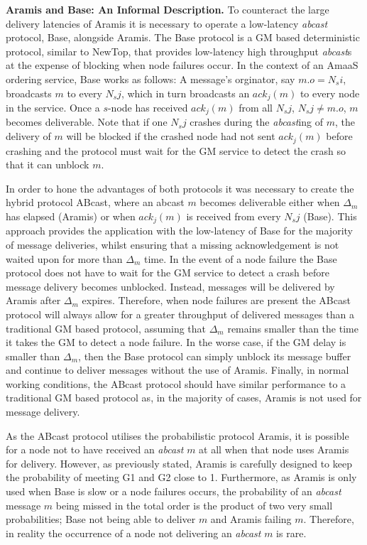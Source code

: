     \textbf{\textsf{Aramis} and \textsf{Base}: An Informal Description.} To counteract the large delivery latencies of \textsf{Aramis} it is necessary to operate a low-latency \emph{abcast} protocol, \textsf{Base}, alongside \textsf{Aramis}.  The \textsf{Base} protocol is a GM based deterministic protocol, similar to NewTop\citep{Ezhilchelvan:1995:NFG:876885.880005}, that provides low-latency high throughput \emph{abcast}s at the expense of blocking when node failures occur.  In the context of an \textsf{AmaaS} ordering service, \textsf{Base} works as follows: A message's orginator, say $m.o = N_si$, broadcasts $m$ to every $N_sj$, which in turn broadcasts an $ack_j(m)$ to every node in the service.  Once a $s$-node has received $ack_j(m)$ from all $N_sj$, $N_sj \neq m.o$, $m$ becomes deliverable.  Note that if one $N_sj$ crashes during the \emph{abcast}ing of $m$, the delivery of $m$ will be blocked if the crashed node had not sent $ack_j(m)$ before crashing and the protocol must wait for the GM service to detect the crash so that it can unblock $m$.   

    
    In order to hone the advantages of both protocols it was necessary to create the hybrid protocol \textsf{ABcast}, where an \textsf{abcast} $m$ becomes deliverable either when $\Delta_m$ has elapsed (\textsf{Aramis}) or when $ack_j(m)$ is received from every $N_sj$ (\textsf{Base}).  This approach provides the application with the low-latency of \textsf{Base} for the majority of message deliveries, whilst ensuring that a missing acknowledgement is not waited upon for more than $\Delta_m$ time.  In the event of a node failure the \textsf{Base} protocol does not have to wait for the GM service to detect a crash before message delivery becomes unblocked.  Instead, messages will be delivered by \textsf{Aramis} after $\Delta_m$ expires.  Therefore, when node failures are present the \textsf{ABcast} protocol will always allow for a greater throughput of delivered messages than a traditional GM based protocol, assuming that $\Delta_m$ remains smaller than the time it takes the GM to detect a node failure.  In the worse case, if the GM delay is smaller than $\Delta_m$, then the \textsf{Base} protocol can simply unblock its message buffer and continue to deliver messages without the use of \textsf{Aramis}.  Finally, in normal working conditions, the \textsf{ABcast} protocol should have similar performance to a traditional GM based protocol as, in the majority of cases, \textsf{Aramis} is not used for message delivery.  

As the \textsf{ABcast} protocol utilises the probabilistic protocol \textsf{Aramis}, it is possible for a node not to have received an \emph{abcast} $m$ at all when that node uses \textsf{Aramis} for delivery.  However, as previously stated, \textsf{Aramis} is carefully designed to keep the probability of meeting G1 and G2 close to 1.  Furthermore, as \textsf{Aramis} is only used when \textsf{Base} is slow or a node failures occurs, the probability of an \emph{abcast} message $m$ being missed in the total order is the product of two very small probabilities; \textsf{Base} not being able to deliver $m$ and \textsf{Aramis} failing $m$.  Therefore, in reality the occurrence of a node not delivering an \emph{abcast} $m$ is rare.   

